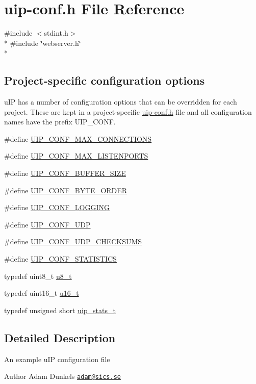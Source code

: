 \hypertarget{uip-conf_8h}{\section{uip-\/conf.h File Reference}
\label{uip-conf_8h}
}
{\ttfamily \#include $<$stdint.\+h$>$}\\*
{\ttfamily \#include \char`\"{}webserver.\+h\char`\"{}}\\*
\subsection*{Project-\/specific configuration options}
\label{_amgrpa633c8dacb583c46c2a4af56ab61e8ca}%
u\+I\+P has a number of configuration options that can be overridden for each project. These are kept in a project-\/specific \hyperlink{uip-conf_8h}{uip-\/conf.\+h} file and all configuration names have the prefix U\+I\+P\+\_\+\+C\+O\+N\+F. \begin{DoxyCompactItemize}
\item 
\#define \hyperlink{group__uipopt_ga3f6f1f6f98431f2d33ed30a30d2ccc35}{U\+I\+P\+\_\+\+C\+O\+N\+F\+\_\+\+M\+A\+X\+\_\+\+C\+O\+N\+N\+E\+C\+T\+I\+O\+N\+S}
\item 
\#define \hyperlink{group__uipopt_ga974c9b4bbe6b07cc1d64ac4fad278030}{U\+I\+P\+\_\+\+C\+O\+N\+F\+\_\+\+M\+A\+X\+\_\+\+L\+I\+S\+T\+E\+N\+P\+O\+R\+T\+S}
\item 
\#define \hyperlink{group__uipopt_gacacc406c3bf7d0e00412e4c946252739}{U\+I\+P\+\_\+\+C\+O\+N\+F\+\_\+\+B\+U\+F\+F\+E\+R\+\_\+\+S\+I\+Z\+E}
\item 
\#define \hyperlink{group__uipopt_gaca1240bba5dd57f8c7c27123c84a1f6d}{U\+I\+P\+\_\+\+C\+O\+N\+F\+\_\+\+B\+Y\+T\+E\+\_\+\+O\+R\+D\+E\+R}
\item 
\#define \hyperlink{group__uipopt_ga3001114ddadc1f2ada5cc9a780e866fc}{U\+I\+P\+\_\+\+C\+O\+N\+F\+\_\+\+L\+O\+G\+G\+I\+N\+G}
\item 
\#define \hyperlink{group__uipopt_ga763f12007aad8cc0e483bf50f8a8d9b4}{U\+I\+P\+\_\+\+C\+O\+N\+F\+\_\+\+U\+D\+P}
\item 
\#define \hyperlink{group__uipopt_ga9dd44616d41cef74d3beb51d8be5ecec}{U\+I\+P\+\_\+\+C\+O\+N\+F\+\_\+\+U\+D\+P\+\_\+\+C\+H\+E\+C\+K\+S\+U\+M\+S}
\item 
\#define \hyperlink{group__uipopt_ga529648ad3b0b327a43689b0f1779ff55}{U\+I\+P\+\_\+\+C\+O\+N\+F\+\_\+\+S\+T\+A\+T\+I\+S\+T\+I\+C\+S}
\item 
typedef uint8\+\_\+t \hyperlink{group__uipopt_ga4caecabca98b43919dd11be1c0d4cd8e}{u8\+\_\+t}
\item 
typedef uint16\+\_\+t \hyperlink{group__uipopt_ga77570ac4fcab86864fa1916e55676da2}{u16\+\_\+t}
\item 
typedef unsigned short \hyperlink{group__uipopt_ga727459e5c4f777543c81ffffa3df3f0c}{uip\+\_\+stats\+\_\+t}
\end{DoxyCompactItemize}


\subsection{Detailed Description}
An example u\+I\+P configuration file \begin{DoxyAuthor}{Author}
Adam Dunkels \href{mailto:adam@sics.se}{\tt adam@sics.\+se} 
\end{DoxyAuthor}
